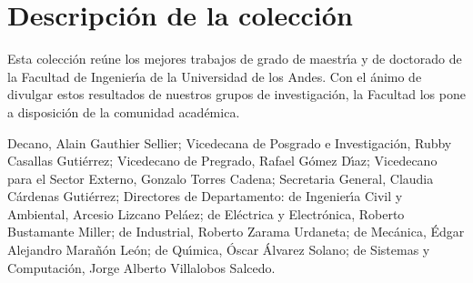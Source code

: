 %


\chapter*{Descripci{\'o}n de la colecci{\'o}n}
\thispagestyle{empty}
\noindent
Esta colecci{\'o}n re{\'u}ne los mejores trabajos de grado de maestr\'{\i}a y de doctorado de la Facultad de Ingenier\'{\i}a de la Universidad de los Andes. Con el {\'a}nimo de divulgar estos resultados de nuestros grupos de investigaci{\'o}n, la Facultad los pone a disposici{\'o}n de la comunidad acad{\'e}mica.

\bigskip

\noindent
Decano, Alain Gauthier Sellier; Vicedecana de Posgrado e Investigaci{\'o}n, Rubby Casallas Guti{\'e}rrez; Vicedecano de Pregrado, Rafael G{\'o}mez D\'{\i}az; Vicedecano para el Sector Externo, Gonzalo Torres Cadena; Secretaria General, Claudia C{\'a}rdenas Guti{\'e}rrez; Directores de Departamento: de Ingenier\'{\i}a Civil y Ambiental, Arcesio Lizcano Pel{\'a}ez; de El{\'e}ctrica y Electr{\'o}nica, Roberto Bustamante Miller; de Industrial, Roberto Zarama Urdaneta; de Mec{\'a}ni\-ca, {\'E}dgar Alejandro Mara{\~n}{\'o}n Le{\'o}n; de Qu\'{\i}mica, {\'O}scar {\'A}lvarez Solano; de Sistemas y Computaci{\'o}n, Jorge Alberto Villalobos Salcedo.



\checklanguage
\endinput 
